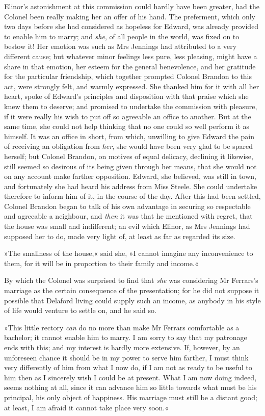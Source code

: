 Elinor’s astonishment at this commission could hardly have been greater, had the Colonel been really making her an offer of his hand. The preferment, which only two days before she had considered as hopeless for Edward, was already provided to enable him to marry; and \textit{she}, of all people in the world, was fixed on to bestow it! Her emotion was such as Mrs Jennings had attributed to a very different cause; but whatever minor feelings less pure, less pleasing, might have a share in that emotion, her esteem for the general benevolence, and her gratitude for the particular friendship, which together prompted Colonel Brandon to this act, were strongly felt, and warmly expressed. She thanked him for it with all her heart, spoke of Edward’s principles and disposition with that praise which she knew them to deserve; and promised to undertake the commission with pleasure, if it were really his wish to put off so agreeable an office to another. But at the same time, she could not help thinking that no one could so well perform it as himself. It was an office in short, from which, unwilling to give Edward the pain of receiving an obligation from \textit{her}, she would have been very glad to be spared herself; but Colonel Brandon, on motives of equal delicacy, declining it likewise, still seemed so desirous of its being given through her means, that she would not on any account make farther opposition. Edward, she believed, was still in town, and fortunately she had heard his address from Miss Steele. She could undertake therefore to inform him of it, in the course of the day. After this had been settled, Colonel Brandon began to talk of his own advantage in securing so respectable and agreeable a neighbour, and \textit{then} it was that he mentioned with regret, that the house was small and indifferent; an evil which Elinor, as Mrs Jennings had supposed her to do, made very light of, at least as far as regarded its size.

»The smallness of the house,« said she, »I cannot imagine any inconvenience to them, for it will be in proportion to their family and income.«

By which the Colonel was surprised to find that \textit{she} was considering Mr Ferrars’s marriage as the certain consequence of the presentation; for he did not suppose it possible that Delaford living could supply such an income, as anybody in his style of life would venture to settle on, and he said so.

»This little rectory \textit{can} do no more than make Mr Ferrars comfortable as a bachelor; it cannot enable him to marry. I am sorry to say that my patronage ends with this; and my interest is hardly more extensive. If, however, by an unforeseen chance it should be in my power to serve him farther, I must think very differently of him from what I now do, if I am not as ready to be useful to him then as I sincerely wish I could be at present. What I am now doing indeed, seems nothing at all, since it can advance him so little towards what must be his principal, his only object of happiness. His marriage must still be a distant good; at least, I am afraid it cannot take place very soon.«

